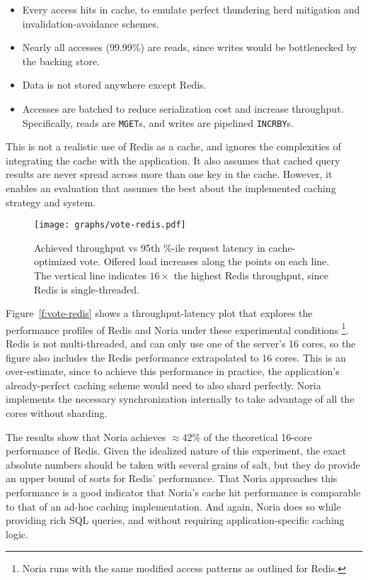 \begin{itemize}
 \item Every access hits in cache, to emulate perfect thundering herd mitigation
   and invalidation-avoidance schemes.
 \item Nearly all accesses (99.99\%) are reads, since writes would be
   bottlenecked by the backing store.
 \item Data is not stored anywhere except Redis.
 \item Accesses are batched to reduce serialization cost and increase
   throughput. Specifically, reads are \texttt{MGET}s, and writes are pipelined
    \texttt{INCRBY}s.
\end{itemize}

This is not a realistic use of Redis as a cache, and ignores the complexities of
integrating the cache with the application. It also assumes that cached query
results are never spread across more than one key in the cache. However, it
enables an evaluation that assumes the best about the implemented caching
strategy and system.

\begin{figure}[h]
  \centering
  \texttt{[image: graphs/vote-redis.pdf]}
  \caption{Achieved throughput vs 95th \%-ile request latency in cache-optimized
  vote. Offered load increases along the points on each line. The vertical
  line indicates $16\times$ the highest Redis throughput, since Redis is
  single-threaded.}
  \label{f:vote-redis}
\end{figure}

Figure~\vref{f:vote-redis} shows a throughput-latency plot that explores the
performance profiles of Redis and Noria under these experimental conditions%
\footnote{Noria runs with the same modified access patterns as outlined for
Redis.}.
Redis is not multi-threaded, and can only use one of the server's 16 cores, so
the figure also includes the Redis performance extrapolated to 16 cores. This is
an over-estimate, since to achieve this performance in practice, the
application's already-perfect caching scheme would need to also shard perfectly.
Noria implements the necessary synchronization internally to take advantage of
all the cores without sharding.

The results show that Noria achieves $\approx$42\% of the theoretical 16-core
performance of Redis. Given the idealized nature of this experiment, the exact
absolute numbers should be taken with several grains of salt, but they do
provide an upper bound of sorts for Redis' performance. That Noria approaches
this performance is a good indicator that Noria's cache hit performance is
comparable to that of an ad-hoc caching implementation. And again, Noria does so
while providing rich SQL queries, and without requiring application-specific
caching logic.

